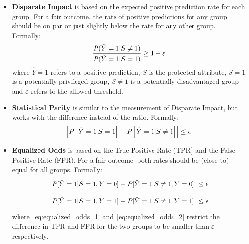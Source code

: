 \begin{itemize}
    \item \textbf{Disparate Impact} is based on the expected positive prediction rate for each group. For a fair outcome, the rate of positive predictions for any group should be on par or just slightly below the rate for any other group. Formally: 
    \begin{equation}
    \frac{P(\hat{Y} = 1|S \neq 1)}{P(\hat{Y} = 1|S = 1)} \geq 1 - \varepsilon
    \label{eq:disparate_impact}
    \addcontentsline{frm}{formulas}{\protect\numberline{\theequation}\hspace{1em}Disparate Impact}
    \end{equation}
    where $\hat{Y} = 1$ refers to a positive prediction, $S$ is the protected attribute, $S=1$ is a potentially privileged group, $S \neq 1$ is a potentially disadvantaged group and $\varepsilon$ refers to the allowed threshold.

    \item \textbf{Statistical Parity} is similar to the measurement of Disparate Impact, but works with the difference instead of the ratio. Formally:
    \begin{equation}
    \left| P\left[\hat{Y} = 1|S = 1\right] - P\left[\hat{Y} = 1|S \neq 1\right] \right| \leq \epsilon
    \label{eq:statistical_parity}
    \addcontentsline{frm}{formulas}{\protect\numberline{\theequation}\hspace{1em}Statistical Parity}
    \end{equation}

    \item \textbf{Equalized Odds} is based on the True Positive Rate (TPR) and the False Positive Rate (FPR). For a fair outcome, both rates should be (close to) equal for all groups. Formally:
    \begin{equation}
    \left| P[\hat{Y} = 1|S = 1, Y = 0] - P[\hat{Y} = 1|S \neq 1, Y = 0] \right| \leq \epsilon
    \label{eq:equalized_odds_1}
    \addcontentsline{frm}{formulas}{\protect\numberline{\theequation}\hspace{1em}Equalized Odds (1)}
    \end{equation}
    \begin{equation}
    \left| P[\hat{Y} = 1|S = 1, Y = 1] - P[\hat{Y} = 1|S \neq 1, Y = 1] \right| \leq \epsilon
    \label{eq:equalized_odds_2}
    \addcontentsline{frm}{formulas}{\protect\numberline{\theequation}\hspace{1em}Equalized Odds (2)}
    \end{equation}
    where~\eqref{eq:equalized_odds_1} and~\eqref{eq:equalized_odds_2} restrict the difference in TPR and FPR for the two groups to be smaller than $\varepsilon$ respectively.


\end{itemize}
